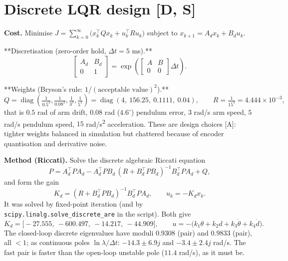 \documentclass[11pt,a4paper]{article}
\begin{document}
\section{Discrete LQR design [D, S]}

\textbf{Cost.} Minimise $\displaystyle J=\sum_{k=0}^{\infty}\bigl(x_k^\top Qx_k+u_k^\top Ru_k\bigr)$ subject to $x_{k+1}=A_dx_k+B_du_k$.

**Discretisation (zero-order hold, $\Delta t=5$ ms).**
\begin{equation*}
\begin{bmatrix}A_d&B_d\\0&1\end{bmatrix}=\exp\!\left(\begin{bmatrix}A&B\\0&0\end{bmatrix}\Delta t\right).
\end{equation*}

**Weights (Bryson's rule: $1/(\text{acceptable value})^2$).**
\begin{equation*}
Q=\operatorname{diag}\!\left(\tfrac1{0.5^2},\tfrac1{0.08^2},\tfrac1{3^2},\tfrac1{5^2}\right)=\operatorname{diag}(4,\ 156.25,\ 0.1111,\ 0.04),\qquad
R=\tfrac1{15^2}=4.444\times10^{-3},
\end{equation*}
that is $0.5$ rad of arm drift, $0.08$ rad ($4.6^\circ$) pendulum error, $3$ rad/s arm speed, $5$ rad/s pendulum speed, $15$ rad/s\textsuperscript{2} acceleration. These are design choices [A]: tighter weights balanced in simulation but chattered because of encoder quantisation and derivative noise.

\textbf{Method (Riccati).} Solve the discrete algebraic Riccati equation
\begin{equation*}
P=A_d^\top PA_d-A_d^\top PB_d\,(R+B_d^\top PB_d)^{-1}B_d^\top PA_d+Q,
\end{equation*}
and form the gain
\begin{equation*}
K_d=(R+B_d^\top PB_d)^{-1}B_d^\top PA_d,\qquad u_k=-K_dx_k .
\end{equation*}
It was solved by fixed-point iteration (and by \texttt{scipy.linalg.solve\_discrete\_are} in the script). Both give
\begin{equation*}
\boxed{K_d=\bigl[-27.555,\ -600.497,\ -14.217,\ -44.909\bigr],\qquad u=-\bigl(k_1\theta+k_2d+k_3\dot\theta+k_4\dot d\bigr).}
\end{equation*}
The closed-loop discrete eigenvalues have moduli $0.9308$ (pair) and $0.9833$ (pair), all $<1$; as continuous poles $\ln\lambda/\Delta t$: $-14.3\pm6.9j$ and $-3.4\pm2.4j$ rad/s. The fast pair is faster than the open-loop unstable pole ($11.4$ rad/s), as it must be.
\end{document}
